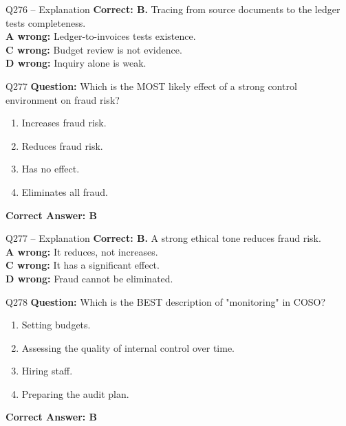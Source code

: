 \documentclass[aspectratio=169,10pt]{beamer}
\begin{document}
	\begin{frame}[t]{Q276 -- Explanation}
		\small
		\textbf{Correct: B.} Tracing from source documents to the ledger tests completeness. \\[4pt]
		\textbf{A wrong:} Ledger-to-invoices tests existence. \\[2pt]
		\textbf{C wrong:} Budget review is not evidence. \\[2pt]
		\textbf{D wrong:} Inquiry alone is weak.
	\end{frame}
	
	\begin{frame}[t]{Q277}
		\small
		\textbf{Question:} Which is the MOST likely effect of a strong control environment on fraud risk?
		\begin{enumerate}[label=\Alph*.,itemsep=1pt,topsep=2pt]
			\item Increases fraud risk.
			\item Reduces fraud risk.
			\item Has no effect.
			\item Eliminates all fraud.
		\end{enumerate}
		\vspace{4pt}
		\textbf{Correct Answer: B}
	\end{frame}
	
	\begin{frame}[t]{Q277 -- Explanation}
		\small
		\textbf{Correct: B.} A strong ethical tone reduces fraud risk. \\[4pt]
		\textbf{A wrong:} It reduces, not increases. \\[2pt]
		\textbf{C wrong:} It has a significant effect. \\[2pt]
		\textbf{D wrong:} Fraud cannot be eliminated.
	\end{frame}
	
	\begin{frame}[t]{Q278}
		\small
		\textbf{Question:} Which is the BEST description of "monitoring" in COSO?
		\begin{enumerate}[label=\Alph*.,itemsep=1pt,topsep=2pt]
			\item Setting budgets.
			\item Assessing the quality of internal control over time.
			\item Hiring staff.
			\item Preparing the audit plan.
		\end{enumerate}
		\vspace{4pt}
		\textbf{Correct Answer: B}
	\end{frame}
	
\end{document}
